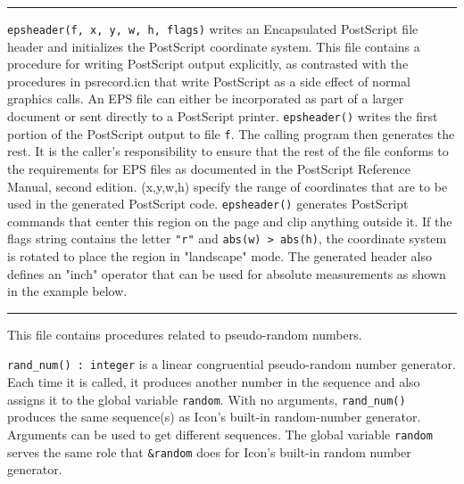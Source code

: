 \vspace{0.25cm}\hrule{}

\texttt{epsheader(f, x, y, w, h, flags)} writes an Encapsulated
PostScript file header and initializes the PostScript coordinate
system. This file contains a procedure for writing PostScript output
explicitly, as contrasted with the procedures in psrecord.icn that
write PostScript as a side effect of normal graphics calls. An EPS file
can either be incorporated as part of a larger document or sent
directly to a PostScript printer. \texttt{epsheader()} writes the first
portion of the PostScript output to file \texttt{f}. The calling
program then generates the rest. It is the caller's
responsibility to ensure that the rest of the file conforms to the
requirements for EPS files as documented in the PostScript Reference
Manual, second edition. (x,y,w,h) specify the range of coordinates that
are to be used in the generated PostScript code. \texttt{epsheader()}
generates PostScript commands that center this region
on the page and clip anything outside it. If the flags string contains
the letter \texttt{"r"} and \texttt{abs(w)
{\textgreater} abs(h)}, the coordinate system is rotated to place the
region in "landscape" mode. The generated
header also defines an "inch" operator that
can be used for absolute measurements as shown in the example below.


\vspace{0.25cm}\hrule{}

This file contains procedures related to pseudo-random numbers.

\texttt{rand\_num() : integer} is a linear congruential pseudo-random
number generator. Each time it is called, it produces
another number in the sequence and also assigns it to the global
variable \texttt{random}. With no arguments, \texttt{rand\_num()}
produces the same sequence(s) as Icon's built-in
random-number generator. Arguments can
be used to get different sequences. The global variable \texttt{random}
serves the same role that \texttt{\&random} does for
Icon's built-in random
number generator.

